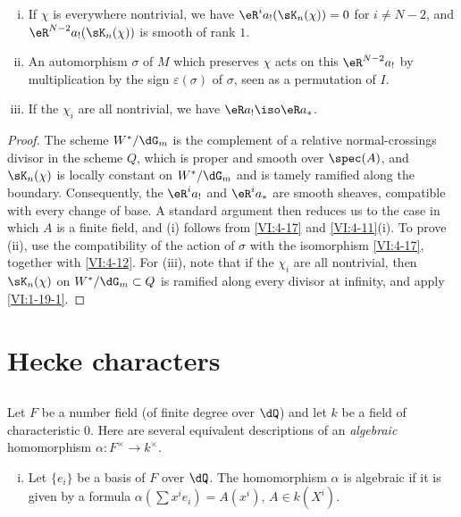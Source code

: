 \documentclass[oneside]{book}
\begin{document}
\begin{proposition_}\label{VI:4-20}
\begin{enumerate}[(i)]
  \item If $\chi$ is everywhere nontrivial, we have 
    $\eR^i a_! (\sK_n(\chi)) = 0$ for $i\ne N-2$, and 
    $\eR^{N-2} a_!(\sK_n(\chi))$ is smooth of rank $1$. 
  \item An automorphism $\sigma$ of $M$ which preserves $\chi$ acts on this 
    $\eR^{N-2} a_!$ by multiplication by the sign $\varepsilon(\sigma)$ 
    of $\sigma$, seen as a permutation of $I$. 
  \item If the $\chi_i$ are all nontrivial, we have $\eR a_! \iso \eR a_\ast$. 
\end{enumerate}
\end{proposition_}
\begin{proof}[Proof]
The scheme $W^\ast/\dG_m$ is the complement of a relative normal-crossings 
divisor in the scheme $Q$, which is proper and smooth over $\spec(A)$, and 
$\sK_n(\chi)$ is locally constant on $W^\ast/\dG_m$ and is tamely ramified 
along the boundary. Consequently, the $\eR^i a_!$ and 
$\eR^i a_\ast$ are smooth sheaves, compatible with every change of 
base. A standard argument then reduces us to the case in which $A$ is a 
finite field, and (i) follows from \ref{VI:4-17} and \ref{VI:4-11}(i). 
To prove (ii), use the compatibility of the action of $\sigma$ with 
the isomorphism \ref{VI:4-17}, together with \ref{VI:4-12}. For (iii), note that if the 
$\chi_i$ are all nontrivial, then $\sK_n(\chi)$ on 
$W^\ast/\dG_m\subset Q$ is ramified along every divisor at infinity, 
and apply \ref{VI:1-19-1}. 
\end{proof}










\section{Hecke characters}\label{VI:5}





\subsection{}\label{VI:5-1}

Let $F$ be a number field (of finite degree over $\dQ$) and let $k$ be a field of 
characteristic $0$. Here are several equivalent descriptions of an 
\emph{algebraic} homomorphism $\alpha:F^\times \to k^\times$. 
\begin{enumerate}[(i)]
  \item Let $\{e_i\}$ be a basis of $F$ over $\dQ$. The homomorphism $\alpha$ is 
    algebraic if it is given by a formula 
    $\alpha(\sum x^i e_i) = A(x^i)$, $A\in k(X^i)$. 
\end{enumerate}
\end{document}
